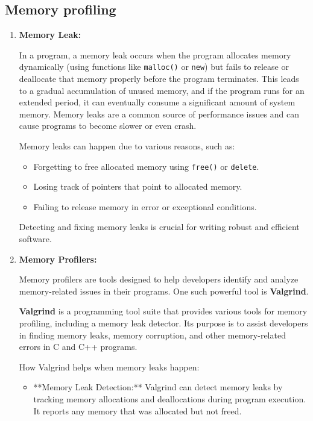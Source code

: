 \documentclass{article}
\begin{document}
\subsection{Memory profiling}
\begin{enumerate}
    \item \textbf{Memory Leak:}
    
    In a program, a memory leak occurs when the program allocates memory dynamically (using functions like \texttt{malloc()} or \texttt{new}) but fails to release or deallocate that memory properly before the program terminates. This leads to a gradual accumulation of unused memory, and if the program runs for an extended period, it can eventually consume a significant amount of system memory. Memory leaks are a common source of performance issues and can cause programs to become slower or even crash.

    Memory leaks can happen due to various reasons, such as:

    \begin{itemize}
        \item Forgetting to free allocated memory using \texttt{free()} or \texttt{delete}.
        \item Losing track of pointers that point to allocated memory.
        \item Failing to release memory in error or exceptional conditions.
    \end{itemize}

    Detecting and fixing memory leaks is crucial for writing robust and efficient software.

    \item \textbf{Memory Profilers:}

    Memory profilers are tools designed to help developers identify and analyze memory-related issues in their programs. One such powerful tool is \textbf{Valgrind}.

    \textbf{Valgrind} is a programming tool suite that provides various tools for memory profiling, including a memory leak detector. Its purpose is to assist developers in finding memory leaks, memory corruption, and other memory-related errors in C and C++ programs.

    How Valgrind helps when memory leaks happen:

    \begin{itemize}
        \item **Memory Leak Detection:** Valgrind can detect memory leaks by tracking memory allocations and deallocations during program execution. It reports any memory that was allocated but not freed.


\end{itemize}
\end{enumerate}
\end{document}
